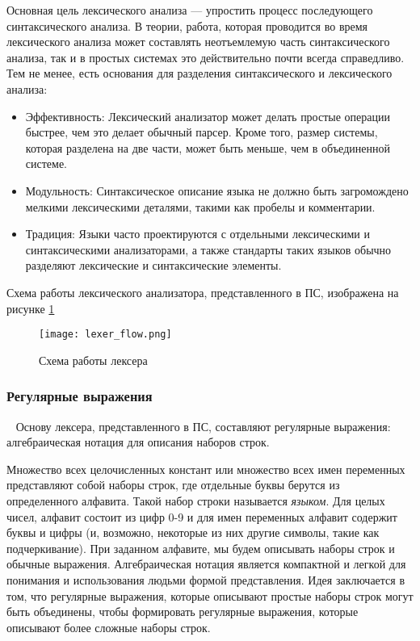 Основная цель лексического анализа --- упростить процесс последующего синтаксического анализа. В теории, работа, которая проводится во время лексического анализа может
составлять неотъемлемую часть синтаксического анализа, так и в простых системах это действительно почти всегда справедливо. Тем не менее, есть основания для разделения синтаксического и лексического анализа:
\begin{itemize}
\item
  Эффективность: Лексический анализатор может делать простые операции быстрее, чем это делает обычный парсер. Кроме того, размер системы, которая разделена на две части, может
  быть меньше, чем в объединенной системе.
\item
  Модульность: Синтаксическое описание языка не должно быть загромождено мелкими лексическими деталями, такими как пробелы и комментарии.
\item
  Традиция: Языки часто проектируются с отдельными лексическими и синтаксическими анализаторами, а также стандарты таких языков обычно разделяют лексические и синтаксические элементы.
\end{itemize}
Схема работы лексического анализатора, представленного в ПС, изображена на рисунке \ref{fig:arch_and_mod::lexer_flow}

\begin{figure}[!htb]
  \centering
  \texttt{[image: lexer\_flow.png]}
  \caption{ Схема работы лексера }
  \label{fig:arch_and_mod::lexer_flow}
\end{figure}



\subsubsection{Регулярные выражения}~
\label{sec:arch_and_mod:regex}
Основу лексера, представленного в ПС, составляют регулярные выражения: алгебраическая нотация для описания наборов строк\cite{regular_expressions_tutorial}.

Множество всех целочисленных констант или множество всех имен переменных представляют собой наборы строк, где отдельные буквы берутся из определенного алфавита. Такой набор
строки называется \textit{языком}. Для целых чисел, алфавит состоит из цифр 0-9 и для имен переменных алфавит содержит буквы и цифры (и, возможно, некоторые из них
другие символы, такие как подчеркивание). При заданном алфавите, мы будем описывать наборы строк и обычные выражения. Алгебраическая нотация является компактной и легкой для понимания и использования людьми формой представления. Идея заключается в том, что регулярные выражения, которые описывают простые наборы строк могут быть объединены, чтобы формировать регулярные выражения, которые описывают более сложные наборы строк.

